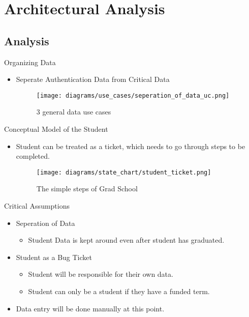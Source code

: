 \documentclass{beamer}
\begin{document}
\section{Architectural Analysis}

\subsection{Analysis}
\begin{frame}{Organizing Data}
\begin{itemize}
\item
Seperate Authentication Data from Critical Data
\begin{figure}[!h]
\texttt{[image: diagrams/use\_cases/seperation\_of\_data\_uc.png]} \caption{ 3 general data use cases } \label{fig:Users}
\end{figure}

\end{itemize}
\end{frame}
\begin{frame}{Conceptual Model of the Student}
\begin{itemize}
\item
Student can be treated as a ticket, which needs to go through steps to be completed.
\begin{figure}[!h]
\texttt{[image: diagrams/state\_chart/student\_ticket.png]} \caption{ The simple steps of Grad School } \label{fig:Users}
\end{figure}
\end{itemize}
\end{frame}
\begin{frame}{Critical Assumptions}
\begin{itemize}
\item Seperation of Data
\begin{itemize}
\item
Student Data is kept around even after student has graduated.
\end{itemize}
\item Student as a Bug Ticket
\begin{itemize}
\item
Student will be responsible for their own data.
\item
Student can only be a student if they have a funded term.
\end{itemize}
\item
Data entry will be done manually at this point.
\end{itemize}
\end{frame}
\end{document}

